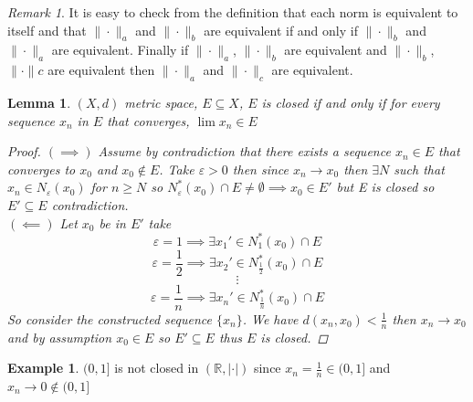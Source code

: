 \documentclass[11pt,openany]{book}
\theoremstyle{plain}
\newtheorem{lemma}{Lemma}[chapter]
\theoremstyle{definition}
\newtheorem{example}{Example}[chapter]
\theoremstyle{remark}
\newtheorem{remark}{Remark}[chapter]
\newcommand{\R}{\mathbb{R}}
\newcommand{\eps}{\varepsilon}
\begin{document}
\begin{remark}
    It is easy to check from the definition that each norm is equivalent to itself and that $\|\cdot\|_a$ and $\|\cdot\|_b$ are equivalent if and only if $\|\cdot\|_b$ and $\|\cdot\|_a$ are equivalent. Finally if $\|\cdot\|_a$, $\|\cdot\|_b$ are equivalent and $\|\cdot\|_b$,$\|\cdot\|c$ are equivalent then $\|\cdot\|_a$ and $\|\cdot\|_c$ are equivalent.
\end{remark}

\begin{lemma}
    $(X,d)$ metric space, $E \subseteq X$, $E$ is closed if and only if for every sequence $x_n$ in $E$ that converges, $\lim x_n \in E$
\begin{proof}
    $(\implies)$ Assume by contradiction that there exists a sequence $x_n \in E$ that converges to $x_0$ and $x_0 \notin E$. Take $\eps > 0$ then since $x_n \to x_0$ then $\exists N$ such that $x_n \in N_{\eps}(x_0)$ for $n \geq N$ so $N^*_{\eps}(x_0) \cap E \ne \emptyset \implies x_0 \in E'$ but E is closed so $E' \subseteq E$ contradiction.
    \\
    $(\impliedby)$ Let $x_0$ be in $E'$ take \[\eps = 1 \implies \exists x_1' \in N_{1}^*(x_0) \cap E\]
    \[\eps = \frac{1}{2} \implies \exists x_2' \in N_{\frac{1}{2}}^*(x_0) \cap E\]
    \[\vdots\]
    \[\eps = \frac{1}{n} \implies \exists x_n' \in N_{\frac{1}{n}}^*(x_0) \cap E\]
    So consider the constructed sequence $\{x_n\}$. We have $d(x_n, x_0) < \frac{1}{n}$ then $x_n \to x_0$ and by assumption $x_0 \in E$ so $E' \subseteq E$ thus $E$ is closed.
\end{proof}
\end{lemma}
\begin{example}
    $(0,1]$ is not closed in $(\R, |\cdot|)$ since $x_n = \frac{1}{n} \in (0,1]$ and $x_n \to 0 \notin (0,1]$
\end{example}
\end{document}
